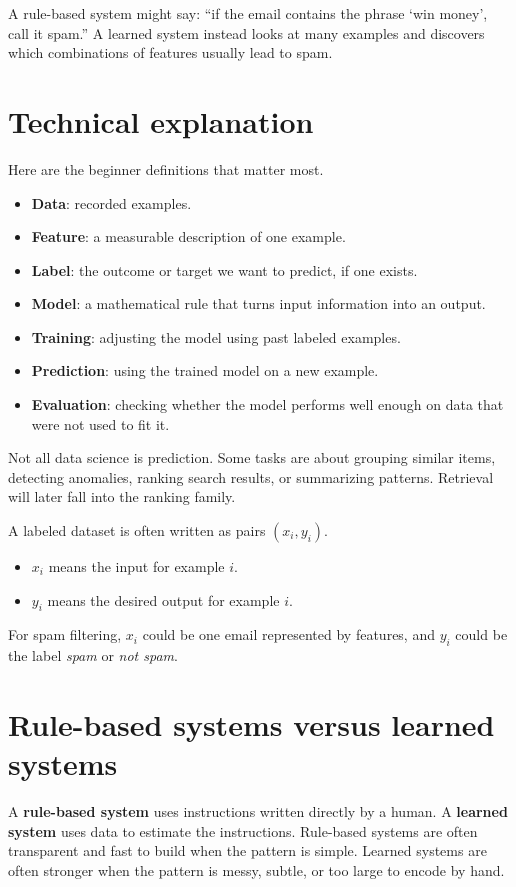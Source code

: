 \documentclass[11pt,oneside]{report}
\newcommand{\term}[1]{\textbf{#1}}
\begin{document}
A rule-based system might say: ``if the email contains the phrase `win money', call it spam.'' A learned system instead looks at many examples and discovers which combinations of features usually lead to spam.

\section*{Technical explanation}
Here are the beginner definitions that matter most.
\begin{itemize}
\item \term{Data}: recorded examples.
\item \term{Feature}: a measurable description of one example.
\item \term{Label}: the outcome or target we want to predict, if one exists.
\item \term{Model}: a mathematical rule that turns input information into an output.
\item \term{Training}: adjusting the model using past labeled examples.
\item \term{Prediction}: using the trained model on a new example.
\item \term{Evaluation}: checking whether the model performs well enough on data that were not used to fit it.
\end{itemize}

Not all data science is prediction. Some tasks are about grouping similar items, detecting anomalies, ranking search results, or summarizing patterns. Retrieval will later fall into the ranking family.

\begin{formulabox}
A labeled dataset is often written as pairs $(x_i,y_i)$.
\begin{itemize}
\item $x_i$ means the input for example $i$.
\item $y_i$ means the desired output for example $i$.
\end{itemize}
For spam filtering, $x_i$ could be one email represented by features, and $y_i$ could be the label \emph{spam} or \emph{not spam}.
\end{formulabox}

\section*{Rule-based systems versus learned systems}
A \term{rule-based system} uses instructions written directly by a human. A \term{learned system} uses data to estimate the instructions. Rule-based systems are often transparent and fast to build when the pattern is simple. Learned systems are often stronger when the pattern is messy, subtle, or too large to encode by hand.
\end{document}
